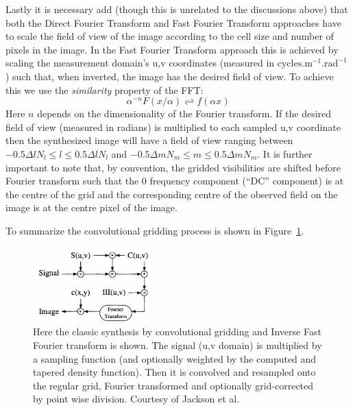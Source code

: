 Lastly it is necessary add (though this is unrelated to the discussions above) that both the Direct Fourier Transform and Fast Fourier Transform approaches
 have to scale the field of view of the image according to the cell size and number of pixels in the image. In the Fast Fourier Transform approach this is 
 achieved by scaling the measurement domain's u,v coordinates (measured in $\text{cycles}.\text{m}^{-1}.\text{rad}^{-1}$) such that, when inverted, the image
 has the desired field of view. To achieve this we use the \emph{similarity} property of the FFT:
 \begin{equation}
  \alpha^{-n}F(x/\alpha) \rightleftharpoons f(\alpha x)
 \end{equation}
 Here $n$ depends on the dimensionality of the Fourier transform. If the desired field of view (measured in radians) is multiplied to each sampled
 u,v coordinate then  the synthesized image will have a field of view ranging between $-0.5\Delta{l}N_l\leq l\leq0.5\Delta{l}N_l$ and 
 $-0.5\Delta{m}N_m\leq m\leq0.5\Delta{m}N_m$. It is further 
 important to note that, by convention, the gridded visibilities are shifted before Fourier transform such that the 0 frequency component 
 (``DC'' component) is at the centre of the grid and the corresponding centre of the observed field on the image is at the centre pixel of the image.
 
 To summarize the convolutional gridding process is shown in Figure~\ref{fig_synth_pipeline}.
 \begin{figure}[h]
  \begin{mdframed}
    \centering
    \includegraphics[width=0.4\textwidth]{images/convolutional_gridding_flow.png}
    \caption[Synthesis using convolutional gridding]{Here the classic synthesis by convolutional gridding and Inverse Fast Fourier transform is shown.
    The signal (u,v domain) is multiplied by a sampling function (and optionally weighted by the computed and tapered density function). Then it is convolved
    and resampled onto the regular grid, Fourier transformed and optionally grid-corrected by point wise division. Courtesy of Jackson et al.\cite{jackson1991selection}}
    \label{fig_synth_pipeline}
  \end{mdframed}
 \end{figure}
 
